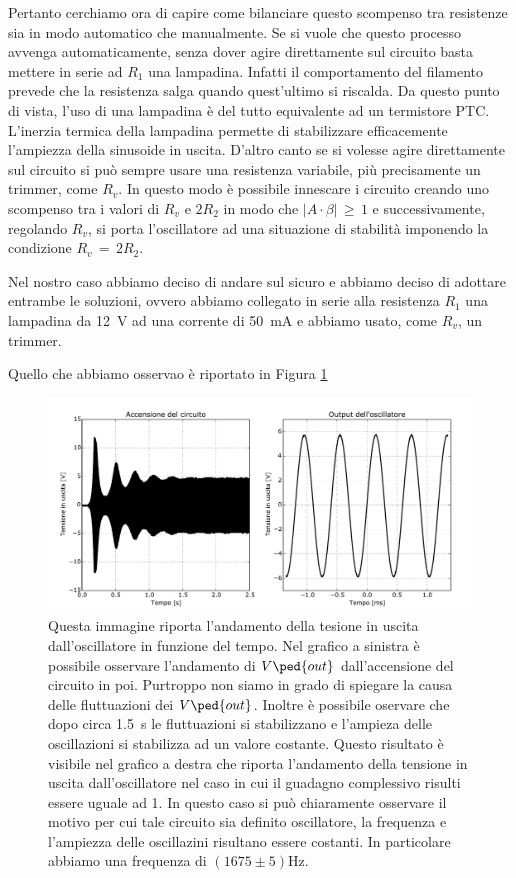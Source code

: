 Pertanto cerchiamo ora di capire come bilanciare questo scompenso tra resistenze sia in modo automatico che manualmente. Se si vuole che questo processo avvenga automaticamente, senza dover agire direttamente sul circuito basta mettere in serie ad $R_1$ una lampadina. Infatti il comportamento del filamento prevede che la resistenza salga quando quest'ultimo si riscalda. Da questo punto di vista, l'uso di una lampadina è del tutto equivalente ad un termistore PTC. L'inerzia termica della lampadina permette di stabilizzare efficacemente l'ampiezza della sinusoide in uscita.
D'altro canto se si volesse agire direttamente sul circuito si può sempre usare una resistenza variabile, più precisamente un trimmer, come $R_v$. In questo modo è possibile innescare i circuito creando uno scompenso tra i valori di $R_v$ e $2R_2$ in modo che $\left|A \cdot \beta \right|\, \geq \,1$ e successivamente, regolando $R_v$, si porta l'oscillatore ad una situazione di stabilità imponendo la condizione $R_v\,=\,2R_2$.

Nel nostro caso abbiamo deciso di andare sul sicuro e abbiamo deciso di adottare entrambe le soluzioni, ovvero abbiamo collegato in serie alla resistenza $R_1$ una lampadina da \SI{12}{\volt} ad una corrente di \SI{50}{\milli\ampere} e abbiamo usato, come $R_v$, un trimmer.

Quello che abbiamo osservao è riportato in Figura \ref{fig:wien_stab}

\begin{figure}[h]
    \includegraphics[height=0.35\textheight]{figure/stab.pdf}
    \caption{Questa immagine riporta l'andamento della tesione in uscita dall'oscillatore in funzione del tempo. Nel grafico a sinistra è possibile osservare l'andamento di $V\ped{out}$ dall'accensione del circuito in poi. Purtroppo non siamo in grado di spiegare la causa delle fluttuazioni dei $V\ped{out}$. Inoltre è possibile oservare che dopo circa \SI{1.5}{\second} le fluttuazioni si stabilizzano e l'ampieza delle oscillazioni si stabilizza ad un valore costante. Questo risultato è visibile nel grafico a destra che riporta l'andamento della tensione in uscita dall'oscillatore nel caso in cui il guadagno complessivo risulti essere uguale ad 1. In questo caso si può chiaramente osservare il motivo per cui tale circuito sia definito oscillatore, la frequenza e l'ampiezza delle oscillazini risultano essere costanti. In particolare abbiamo una frequenza di $(1675 \pm 5) \si{\hertz}$.}
    \label{fig:wien_stab}
\end{figure}

